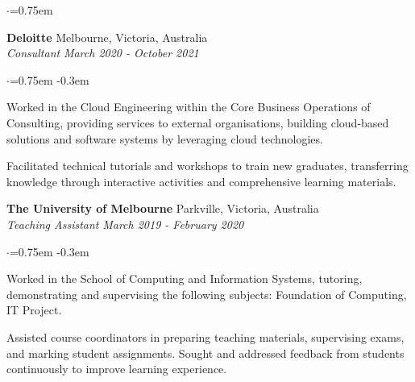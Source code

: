 \documentclass{cv}
\begin{document}
\begin{list}{}{\setlength{\leftmargin}{0em}}
\begin{list}{$\cdot$}{\leftmargin=0.75em}
    \end{list}
    \smallskip
\item[]
    \textbf{Deloitte} \hfill {Melbourne, Victoria, Australia}%
    \\ 
    {\em Consultant} \hfill {\em March 2020 - October 2021}%
    \begin{list}{$\cdot$}{\leftmargin=0.75em}
    \itemsep -0.3em \vspace{-0.3em}
        \item Worked in the Cloud Engineering within the Core Business Operations of Consulting, providing services to external organisations, building cloud-based solutions and software systems by leveraging cloud technologies.
        \item Facilitated technical tutorials and workshops to train new graduates, transferring knowledge through interactive activities and comprehensive learning materials.
    \end{list}
    \smallskip
\item[]
    \textbf{The University of Melbourne} \hfill {Parkville, Victoria, Australia}%
    \\ 
    {\em Teaching Assistant} \hfill {\em March 2019 - February 2020}%
    \begin{list}{$\cdot$}{\leftmargin=0.75em}
    \itemsep -0.3em \vspace{-0.3em}
        \item Worked in the School of Computing and Information Systems, tutoring, demonstrating and supervising the following subjects: Foundation of Computing, IT Project.
        \item Assisted course coordinators in preparing teaching materials, supervising exams, and marking student assignments. Sought and addressed feedback from students continuously to improve learning experience.
    \end{list}
    \smallskip
\end{list}
\end{document}
